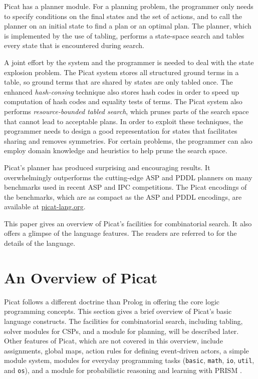 \documentclass{new_tlp}
\begin{document}
Picat has a planner module. For a planning problem, the programmer only needs to specify conditions on the final states and the set of actions, and to call the planner on an initial state to find a plan or an optimal plan. The planner, which is implemented by the use of tabling, performs a state-space search and tables every state that is encountered during search. 

A joint effort by the system and the programmer is needed to deal with the state explosion problem. The Picat system stores all structured ground terms in a table, so ground terms that are shared by states are only tabled once. The enhanced {\it hash-consing} technique \cite{ZhouH12} also stores hash codes in order to speed up computation of hash codes and equality tests of terms. The Picat system also performs {\it resource-bounded tabled search}, which prunes parts of the search space that cannot lead to acceptable plans. In order to exploit these techniques, the programmer needs to design a good representation for states that facilitates sharing and removes symmetries. For certain problems, the programmer can also employ domain knowledge and heuristics to help prune the search space. 

Picat's planner has produced surprising and encouraging results. It overwhelmingly outperforms the cutting-edge ASP and PDDL planners on many benchmarks used in recent ASP and IPC competitions. The Picat encodings of the benchmarks, which are as compact as the ASP and PDDL encodings, are available at \url{picat-lang.org}.

This paper gives an overview of Picat's facilities for combinatorial search. It also offers a glimpse of the language features. The readers are referred to \cite{PicatGuide,Kjellerstrand14} for the details of the language.

\section{\label{sec:overview}An Overview of Picat}
Picat follows a different doctrine than Prolog in offering the core logic programming concepts. This section gives a brief overview of Picat's basic language constructs. The facilities for combinatorial search, including tabling, solver modules for CSPs, and a module for planning, will be described later. Other features of Picat, which are not covered in this overview, include assignments, global maps, action rules for defining event-driven actors, a simple module system, modules for everyday programming tasks ({\tt basic}, {\tt math}, {\tt io}, {\tt util}, and {\tt os}), and a module for probabilistic reasoning and learning with PRISM \cite{prism:website}. 
\end{document}
